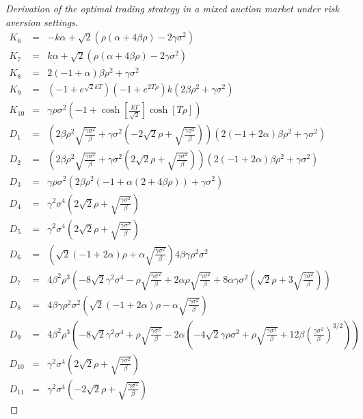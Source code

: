 \begin{proof}[Derivation of the optimal trading strategy in a mixed auction market under risk aversion settings]
\begin{eqnarray*}
    K_6 &=& -k \alpha +\sqrt{2} \left(\rho  (\alpha +4 \beta  \rho )-2 \gamma  \sigma ^2\right)\\
    K_7 &=& k \alpha +\sqrt{2} \left(\rho  (\alpha +4 \beta  \rho )-2 \gamma  \sigma ^2\right)\\
    K_8 &=& 2 (-1+\alpha ) \beta  \rho ^2+\gamma  \sigma ^2\\
    K_9 &=& \left(-1+e^{\sqrt{2} k T}\right) \left(-1+e^{2 T \rho }\right) k \left(2 \beta  \rho ^2+\gamma  \sigma ^2\right)\\
    K_{10} &=& \gamma  \rho  \sigma ^2 \left(-1+\cosh\left[\frac{k T}{\sqrt{2}}\right] \cosh[T \rho ]\right)\\
    D_1 &=& \left(2 \beta  \rho ^2 \sqrt{\frac{\gamma  \sigma ^2}{\beta }}+\gamma  \sigma ^2 \left(-2 \sqrt{2} \rho +\sqrt{\frac{\gamma  \sigma ^2}{\beta }}\right)\right)
    \left(2 (-1+2 \alpha ) \beta  \rho ^2+\gamma  \sigma ^2\right)\\
    D_2 &=& \left(2 \beta  \rho ^2 \sqrt{\frac{\gamma  \sigma ^2}{\beta }}+\gamma  \sigma ^2 \left(2 \sqrt{2} \rho +\sqrt{\frac{\gamma  \sigma ^2}{\beta }}\right)\right)
    \left(2 (-1+2 \alpha ) \beta  \rho ^2+\gamma  \sigma ^2\right)\\
    D_3 &=& \gamma  \rho  \sigma ^2 \left(2 \beta  \rho ^2 (-1+\alpha  (2+4 \beta  \rho ))+\gamma  \sigma ^2\right) \\
    D_4 &=& \gamma ^2 \sigma ^4 \left(2 \sqrt{2} \rho +\sqrt{\frac{\gamma  \sigma ^2}{\beta }}\right)\\
    D_5 &=& \gamma ^2 \sigma ^4 \left(2 \sqrt{2} \rho +\sqrt{\frac{\gamma  \sigma ^2}{\beta }}\right)\\
    D_6 &=& \left(\sqrt{2} (-1+2 \alpha ) \rho +\alpha  \sqrt{\frac{\gamma  \sigma ^2}{\beta }}\right) 4 \beta  \gamma  \rho ^2 \sigma ^2\\
    D_7 &=& 4 \beta ^2 \rho ^3 \left(-8 \sqrt{2} \gamma ^2 \sigma ^4-\rho  \sqrt{\frac{\gamma  \sigma ^2}{\beta }}+2 \alpha  \rho  \sqrt{\frac{\gamma  \sigma
        ^2}{\beta }}+8 \alpha  \gamma  \sigma ^2 \left(\sqrt{2} \rho +3 \sqrt{\frac{\gamma  \sigma ^2}{\beta }}\right)\right)\\
    D_8 &=& 4 \beta  \gamma  \rho ^2 \sigma ^2 \left(\sqrt{2} (-1+2 \alpha ) \rho -\alpha  \sqrt{\frac{\gamma  \sigma ^2}{\beta }}\right)\\
    D_9 &=& 4 \beta ^2 \rho ^3 \left(-8 \sqrt{2} \gamma ^2 \sigma ^4+\rho  \sqrt{\frac{\gamma  \sigma ^2}{\beta }}-2 \alpha  \left(-4 \sqrt{2} \gamma  \rho
      \sigma ^2+\rho  \sqrt{\frac{\gamma  \sigma ^2}{\beta }}+12 \beta  \left(\frac{\gamma  \sigma ^2}{\beta }\right)^{3/2}\right)\right)\\
    D_{10} &=& \gamma ^2 \sigma ^4 \left(2 \sqrt{2} \rho +\sqrt{\frac{\gamma  \sigma ^2}{\beta }}\right)\\
    D_{11} &=& \gamma ^2 \sigma ^4 \left(-2 \sqrt{2} \rho +\sqrt{\frac{\gamma  \sigma ^2}{\beta }}\right)
  \end{eqnarray*}

\end{proof}